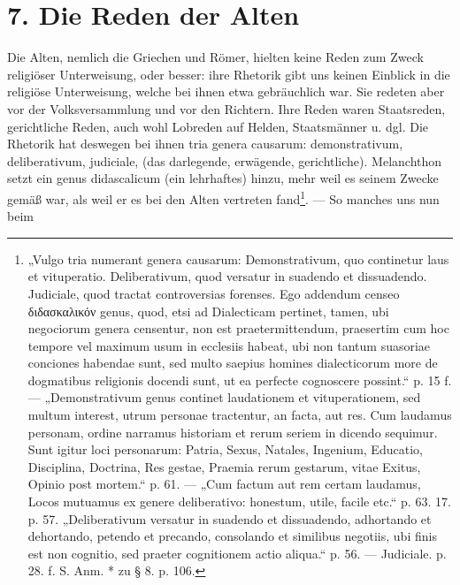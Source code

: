 \section{7. Die Reden der Alten}

Die Alten, nemlich die Griechen und Römer, hielten keine Reden zum Zweck religiöser Unterweisung, oder besser: ihre Rhetorik gibt uns keinen Einblick in die religiöse Unterweisung, welche bei ihnen etwa gebräuchlich war. Sie redeten aber vor der Volksversammlung und vor den Richtern. Ihre Reden waren Staatsreden, gerichtliche Reden, auch wohl Lobreden auf Helden, Staatsmänner u. dgl. Die Rhetorik hat deswegen bei ihnen tria genera causarum: demonstrativum, deliberativum, judiciale, (das darlegende, erwägende, gerichtliche). Melanchthon setzt ein genus didascalicum (ein lehrhaftes) hinzu, mehr weil es seinem Zwecke gemäß war, als weil er es bei den Alten vertreten fand\footnote{„Vulgo tria numerant genera causarum: Demonstrativum, quo continetur laus et vituperatio. Deliberativum, quod versatur in suadendo et dissuadendo. Judiciale, quod tractat controversias forenses. Ego addendum censeo διδασκαλικόν genus, quod, etsi ad Dialecticam pertinet, tamen, ubi negociorum genera censentur, non est praetermittendum, praesertim cum hoc tempore vel maximum usum in ecclesiis habeat, ubi non tantum suasoriae conciones habendae sunt, sed multo saepius homines dialecticorum more de dogmatibus religionis docendi sunt, ut ea perfecte cognoscere possint.“ p. 15 f. — „Demonstrativum genus continet laudationem et vituperationem, sed multum interest, utrum personae tractentur, an facta, aut res. Cum laudamus personam, ordine narramus historiam et rerum seriem in dicendo sequimur. Sunt igitur loci personarum: Patria, Sexus, Natales, Ingenium, Educatio, Disciplina, Doctrina, Res gestae, Praemia rerum gestarum, vitae Exitus, Opinio post mortem.“ p. 61. — „Cum factum aut rem certam laudamus, Locos mutuamus ex genere deliberativo: honestum, utile, facile etc.“ p. 63. 17. p. 57. „Deliberativum versatur in suadendo et dissuadendo, adhortando et dehortando, petendo et precando, consolando et similibus negotiis, ubi finis est non cognitio, sed praeter cognitionem actio aliqua.“ p. 56. — Judiciale. p. 28. f. S. Anm. * zu § 8. p. 106.}. — So manches uns nun beim
